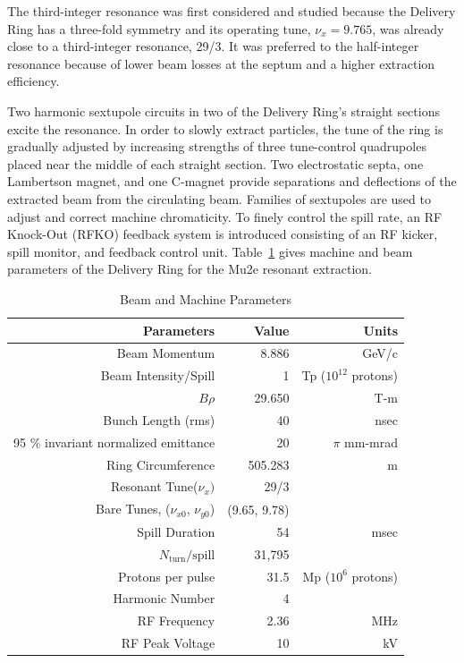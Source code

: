 \documentclass[aps,prstab,showpacs,onecolumn,12pt]{revtex4-1}
\begin{document}
The third-integer resonance was first considered and studied because the Delivery Ring has a three-fold symmetry
and its operating tune, $\nu_{x} = 9.765$, was already close to a third-integer resonance, 29/3. 
It was preferred to the half-integer resonance because of lower beam losses at the septum and a higher extraction efficiency.

Two harmonic sextupole circuits in two of the Delivery Ring's straight sections excite the resonance. In order to slowly extract particles, the tune of the ring is gradually adjusted by increasing strengths of three tune-control quadrupoles placed near the middle of each straight section. Two electrostatic septa, one Lambertson magnet, and one C-magnet provide separations and deflections of the extracted beam from the circulating beam. Families of sextupoles are used to adjust and correct machine chromaticity. To finely control the spill rate, an RF Knock-Out (RFKO) feedback system is introduced consisting of an RF kicker, spill monitor, and feedback control unit. Table~\ref{table:param} gives machine and beam parameters of the Delivery Ring for the Mu2e resonant extraction.

\begin{table}[!bp]
    \begin{tabular}{rrr}
    \hline
     Parameters                & Value              & Units         \\
    \hline
      Beam Momentum     & 8.886    & GeV/c   \\
      Beam Intensity/Spill         &  1 & Tp ($10^{12}$ protons)       \\
      $B \rho$                  & 29.650             & T-m           \\
      Bunch Length (rms)        & 40                 & nsec          \\ 
      95 \% invariant normalized emittance & 20     & $\pi$ mm-mrad \\
      Ring Circumference  & 505.283            & m             \\
      Resonant Tune($\nu_{x})$   & 29/3 &  \\
      Bare Tunes, ($\nu_{x0}$, $\nu_{y0}$)   & (9.65, 9.78)   &    \\
      Spill Duration &  54  & msec \\
      $N_{\text{turn}} / {\text{spill}}$    & 31,795   &    \\
      Protons per pulse     & 31.5  &  Mp ($10^{6}$ protons)  \\
      Harmonic Number           & 4                  &               \\
      RF Frequency              & 2.36               & MHz           \\
      RF Peak Voltage                & 10                 & kV            \\
    \hline
    \end{tabular}
    \caption{\label{table:param}Beam and Machine Parameters}
\end{table}
\end{document}
